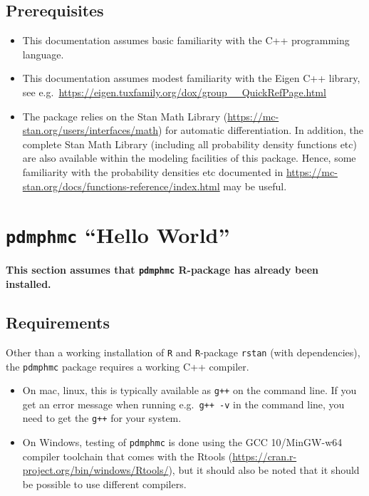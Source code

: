 \documentclass[
]{book}
\providecommand{\tightlist}{%
  \setlength{\itemsep}{0pt}\setlength{\parskip}{0pt}}
\begin{document}
\hypertarget{prerequisites}{%
\section{Prerequisites}\label{prerequisites}}

\begin{itemize}
\item
  This documentation assumes basic familiarity with the C++ programming language.
\item
  This documentation assumes modest familiarity with the Eigen C++ library, see e.g.~\url{https://eigen.tuxfamily.org/dox/group__QuickRefPage.html}
\item
  The package relies on the Stan Math Library (\url{https://mc-stan.org/users/interfaces/math}) for automatic differentiation. In addition, the complete Stan Math Library (including all probability density functions etc) are also available within the modeling facilities of this package. Hence, some familiarity with the probability densities etc documented in \url{https://mc-stan.org/docs/functions-reference/index.html} may be useful.
\end{itemize}

\hypertarget{pdmphmc-hello-world}{%
\chapter{\texorpdfstring{\texttt{pdmphmc} ``Hello World''}{pdmphmc ``Hello World''}}\label{pdmphmc-hello-world}}

\textbf{This section assumes that \texttt{pdmphmc} R-package has already been installed.}

\hypertarget{requirements}{%
\section{Requirements}\label{requirements}}

Other than a working installation of \texttt{R} and \texttt{R}-package \texttt{rstan} (with dependencies), the \texttt{pdmphmc} package requires a working C++ compiler.

\begin{itemize}
\tightlist
\item
  On mac, linux, this is typically available as \texttt{g++} on the command line. If you get an error message when running e.g.~\texttt{g++\ -v} in the command line, you need to get the \texttt{g++} for your system.
\item
  On Windows, testing of \texttt{pdmphmc} is done using the GCC 10/MinGW-w64 compiler toolchain that comes with the Rtools (\url{https://cran.r-project.org/bin/windows/Rtools/}), but it should also be noted that it should be possible to use different compilers.
\end{itemize}
\end{document}
